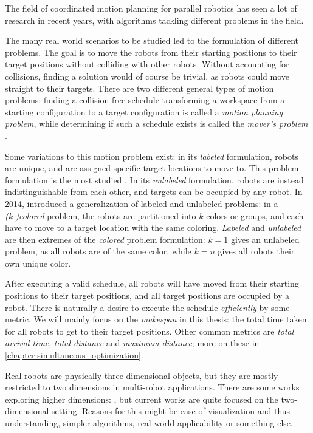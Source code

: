 The field of coordinated motion planning for parallel robotics has seen a lot of research in recent years, with algorithms tackling different problems in the field.


The many real world scenarios to be studied led to the formulation of different problems.
The goal is to move the robots from their starting positions to their target positions without colliding with other robots.
Without accounting for collisions, finding a solution would of course be trivial, as robots could move straight to their targets.
There are two different general types of motion problems: finding a collision-free schedule transforming a workspace from a starting configuration to a target configuration is called a \emph{motion planning problem}, while determining if such a schedule exists is called the \emph{mover's problem} \cite{siamcomp/HopcroftW86}.

Some variations to this motion problem exist: in its \emph{labeled} formulation, robots are unique, and are assigned specific target locations to move to.
This problem formulation is the most studied \cite{fun/BrockenHKLS21}.
In its \emph{unlabeled} formulation, robots are instead indistinguishable from each other, and targets can be occupied by any robot.
In 2014, \cite{ijrr/SoloveyH14} introduced a generalization of labeled and unlabeled problems: in a \emph{(k-)colored} problem, the robots are partitioned into $k$ colors or groups, and each have to move to a target location with the same coloring.
\emph{Labeled} and \emph{unlabeled} are then extremes of the \emph{colored} problem formulation: $k=1$ gives an unlabeled problem, as all robots are of the same color, while $k=n$ gives all robots their own unique color.

After executing a valid schedule, all robots will have moved from their starting positions to their target positions, and all target positions are occupied by a robot.
There is naturally a desire to execute the schedule \emph{efficiently} by some metric.
We will mainly focus on the \emph{makespan} in this thesis: the total time taken for all robots to get to their target positions.
Other common metrics are \emph{total arrival time}, \emph{total distance} and \emph{maximum distance}; more on these in \cref{chapter:simultaneous_optimization}. 

Real robots are physically three-dimensional objects, but they are mostly restricted to two dimensions in multi-robot applications.
There are some works exploring higher dimensions: \cite{arobots/TurpinMMK14}, but current works are quite focused on the two-dimensional setting.
Reasons for this might be ease of visualization and thus understanding, simpler algorithms, real world applicability or something else.

